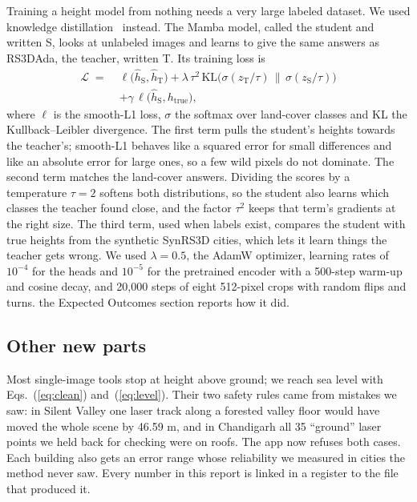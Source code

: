 \documentclass[11pt,a4paper]{article}
\newcommand{\m}{\ifmmode\,\mathrm{m}\else\,m\fi}
\begin{document}
Training a height model from nothing needs a very large labeled dataset. We used knowledge distillation~\cite{hinton2015distilling} instead. The Mamba model, called the student and written S, looks at unlabeled images and learns to give the same answers as RS3DAda, the teacher, written T. Its training loss is
\begin{equation}
\begin{split}
\mathcal{L} \;=\;& \ell\bigl(\hat h_{\mathrm S},\hat h_{\mathrm T}\bigr)
+ \lambda\,\tau^{2}\,\mathrm{KL}\!\bigl(\sigma(z_{\mathrm T}/\tau)\,\big\|\,\sigma(z_{\mathrm S}/\tau)\bigr)\\
&+ \gamma\,\ell\bigl(\hat h_{\mathrm S},h_{\mathrm{true}}\bigr),
\end{split}
\label{eq:distill}
\end{equation}
where $\ell$ is the smooth-L1 loss, $\sigma$ the softmax over land-cover classes and KL the Kullback--Leibler divergence. The first term pulls the student's heights towards the teacher's; smooth-L1 behaves like a squared error for small differences and like an absolute error for large ones, so a few wild pixels do not dominate. The second term matches the land-cover answers. Dividing the scores by a temperature $\tau = 2$ softens both distributions, so the student also learns which classes the teacher found close, and the factor $\tau^2$ keeps that term's gradients at the right size. The third term, used when labels exist, compares the student with true heights from the synthetic SynRS3D cities, which lets it learn things the teacher gets wrong. We used $\lambda = 0.5$, the AdamW optimizer, learning rates of $10^{-4}$ for the heads and $10^{-5}$ for the pretrained encoder with a 500-step warm-up and cosine decay, and 20,000 steps of eight 512-pixel crops with random flips and turns. the Expected Outcomes section reports how it did.

\subsection{Other new parts}
Most single-image tools stop at height above ground; we reach sea level with Eqs.~(\ref{eq:clean}) and~(\ref{eq:level}). Their two safety rules came from mistakes we saw: in Silent Valley one laser track along a forested valley floor would have moved the whole scene by 46.59\m, and in Chandigarh all 35 ``ground'' laser points we held back for checking were on roofs. The app now refuses both cases. Each building also gets an error range whose reliability we measured in cities the method never saw. Every number in this report is linked in a register to the file that produced it.
\end{document}
